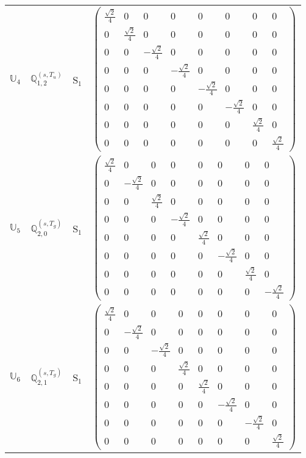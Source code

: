 \documentclass[fleqn,10pt,landscape]{article}
\begin{document}
\begin{itemize}
\begin{center}
\begin{longtable}{c|c|c|c}
$ \mathbb{U}_{4} $ & $\mathbb{Q}_{1,2}^{(s,T_{u})}$ & S$_{1}$ & $\begin{pmatrix} \frac{\sqrt{2}}{4} & 0 & 0 & 0 & 0 & 0 & 0 & 0 \\ 0 & \frac{\sqrt{2}}{4} & 0 & 0 & 0 & 0 & 0 & 0 \\ 0 & 0 & - \frac{\sqrt{2}}{4} & 0 & 0 & 0 & 0 & 0 \\ 0 & 0 & 0 & - \frac{\sqrt{2}}{4} & 0 & 0 & 0 & 0 \\ 0 & 0 & 0 & 0 & - \frac{\sqrt{2}}{4} & 0 & 0 & 0 \\ 0 & 0 & 0 & 0 & 0 & - \frac{\sqrt{2}}{4} & 0 & 0 \\ 0 & 0 & 0 & 0 & 0 & 0 & \frac{\sqrt{2}}{4} & 0 \\ 0 & 0 & 0 & 0 & 0 & 0 & 0 & \frac{\sqrt{2}}{4} \end{pmatrix}$ \\
$ \mathbb{U}_{5} $ & $\mathbb{Q}_{2,0}^{(s,T_{g})}$ & S$_{1}$ & $\begin{pmatrix} \frac{\sqrt{2}}{4} & 0 & 0 & 0 & 0 & 0 & 0 & 0 \\ 0 & - \frac{\sqrt{2}}{4} & 0 & 0 & 0 & 0 & 0 & 0 \\ 0 & 0 & \frac{\sqrt{2}}{4} & 0 & 0 & 0 & 0 & 0 \\ 0 & 0 & 0 & - \frac{\sqrt{2}}{4} & 0 & 0 & 0 & 0 \\ 0 & 0 & 0 & 0 & \frac{\sqrt{2}}{4} & 0 & 0 & 0 \\ 0 & 0 & 0 & 0 & 0 & - \frac{\sqrt{2}}{4} & 0 & 0 \\ 0 & 0 & 0 & 0 & 0 & 0 & \frac{\sqrt{2}}{4} & 0 \\ 0 & 0 & 0 & 0 & 0 & 0 & 0 & - \frac{\sqrt{2}}{4} \end{pmatrix}$ \\
$ \mathbb{U}_{6} $ & $\mathbb{Q}_{2,1}^{(s,T_{g})}$ & S$_{1}$ & $\begin{pmatrix} \frac{\sqrt{2}}{4} & 0 & 0 & 0 & 0 & 0 & 0 & 0 \\ 0 & - \frac{\sqrt{2}}{4} & 0 & 0 & 0 & 0 & 0 & 0 \\ 0 & 0 & - \frac{\sqrt{2}}{4} & 0 & 0 & 0 & 0 & 0 \\ 0 & 0 & 0 & \frac{\sqrt{2}}{4} & 0 & 0 & 0 & 0 \\ 0 & 0 & 0 & 0 & \frac{\sqrt{2}}{4} & 0 & 0 & 0 \\ 0 & 0 & 0 & 0 & 0 & - \frac{\sqrt{2}}{4} & 0 & 0 \\ 0 & 0 & 0 & 0 & 0 & 0 & - \frac{\sqrt{2}}{4} & 0 \\ 0 & 0 & 0 & 0 & 0 & 0 & 0 & \frac{\sqrt{2}}{4} \end{pmatrix}$ \\

\end{longtable}
\end{center}
\end{itemize}
\end{document}
